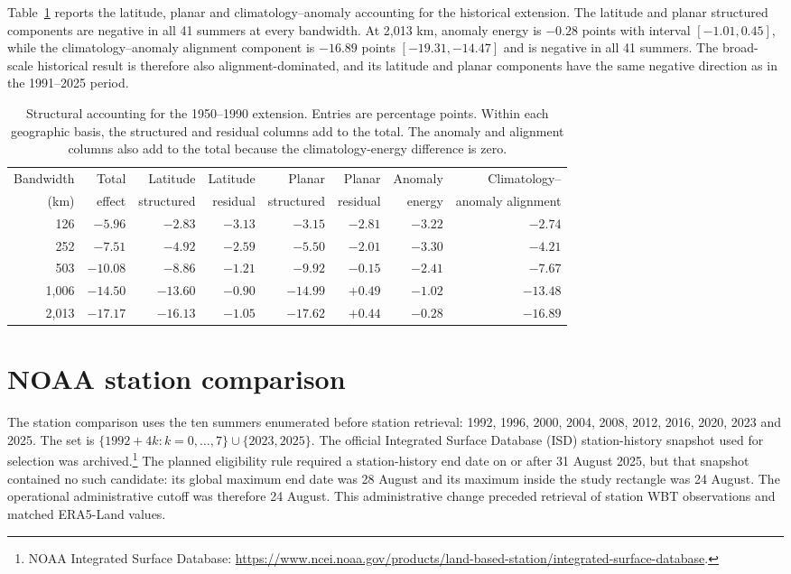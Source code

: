 \documentclass[namedate,webpdf,modern,mediumone]{oup-authoring-template}
\theoremstyle{thmstyleone}
\begin{document}
Table~\ref{tab:historical-structure} reports the latitude, planar and
climatology--anomaly accounting for the historical extension. The latitude
and planar structured components are
negative in all 41 summers at every bandwidth. At 2,013 km, anomaly energy is
$-0.28$ points with interval $[-1.01,0.45]$, while the climatology--anomaly
alignment component is $-16.89$ points $[-19.31,-14.47]$ and is negative in
all 41 summers. The broad-scale historical result is therefore also
alignment-dominated, and its latitude and planar components have the same
negative direction as in the 1991--2025 period.

\begin{table}[htbp]
\centering
\caption{Structural accounting for the 1950--1990 extension. Entries are
percentage points. Within each geographic basis, the structured and residual
columns add to the total. The anomaly and alignment columns also add to the
total because the climatology-energy difference is zero.}
\label{tab:historical-structure}
\scriptsize
\setlength{\tabcolsep}{4pt}
\begin{tabular}{rrrrrrrr}
\toprule
Bandwidth & Total & Latitude & Latitude & Planar & Planar & Anomaly & Climatology-- \\
(km) & effect & structured & residual & structured & residual & energy & anomaly alignment \\
\midrule
126   & $-5.96$  & $-2.83$  & $-3.13$ & $-3.15$  & $-2.81$ & $-3.22$ & $-2.74$ \\
252   & $-7.51$  & $-4.92$  & $-2.59$ & $-5.50$  & $-2.01$ & $-3.30$ & $-4.21$ \\
503   & $-10.08$ & $-8.86$  & $-1.21$ & $-9.92$  & $-0.15$ & $-2.41$ & $-7.67$ \\
1,006 & $-14.50$ & $-13.60$ & $-0.90$ & $-14.99$ & $+0.49$ & $-1.02$ & $-13.48$ \\
2,013 & $-17.17$ & $-16.13$ & $-1.05$ & $-17.62$ & $+0.44$ & $-0.28$ & $-16.89$ \\
\bottomrule
\end{tabular}
\end{table}

\section{NOAA station comparison}
\label{sec:noaa-extension}

The station comparison uses the ten summers enumerated before station
retrieval: 1992, 1996, 2000, 2004, 2008, 2012, 2016, 2020, 2023 and 2025. The
set is $\{1992+4k:k=0,\ldots,7\}\cup\{2023,2025\}$. The
official Integrated Surface Database (ISD) station-history snapshot used for
selection was archived.\footnote{NOAA Integrated Surface Database:
\url{https://www.ncei.noaa.gov/products/land-based-station/integrated-surface-database}.}
The planned eligibility rule required a station-history end date on or after
31 August 2025, but that snapshot contained no such candidate: its global
maximum end date was 28 August and its maximum inside the study
rectangle was 24 August. The operational administrative cutoff was therefore
24 August. This administrative change preceded retrieval of station WBT
observations and matched ERA5-Land values.
\end{document}
